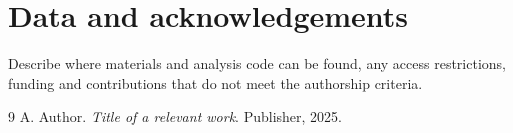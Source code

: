 \documentclass[11pt,a4paper]{article}
\begin{document}
\section*{Data and acknowledgements}
Describe where materials and analysis code can be found, any access restrictions,
funding and contributions that do not meet the authorship criteria.
\begin{thebibliography}{9}
 A. Author. \textit{Title of a relevant work}. Publisher, 2025.
\end{thebibliography}
\end{document}
